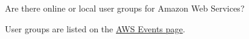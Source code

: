 



Are there online or local user groups for Amazon Web Services?




User groups are listed on the \href{https://aws.amazon.com/about-aws/events/}{AWS Events page}.
